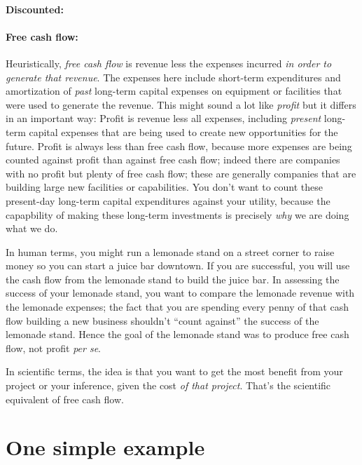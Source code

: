 \documentclass[12pt,twoside,pdftex]{article}
\begin{document}
\paragraph{Discounted:}

\paragraph{Free cash flow:}
Heuristically, \emph{free cash flow} is revenue less the expenses
incurred \emph{in order to generate that revenue}.  The expenses here
include short-term expenditures and amortization of \emph{past}
long-term capital expenses on equipment or facilities that were used
to generate the revenue.  This might sound a lot like \emph{profit}
but it differs in an important way: Profit is revenue less all
expenses, including \emph{present} long-term capital expenses that are
being used to create new opportunities for the future.  Profit is
always less than free cash flow, because more expenses are being
counted against profit than against free cash flow; indeed there are
companies with no profit but plenty of free cash flow; these are
generally companies that are building large new facilities or
capabilities.  You don't want to count these present-day long-term
capital expenditures against your utility, because the capapbility of
making these long-term investments is precisely \emph{why} we are
doing what we do.

In human terms, you might run a lemonade stand on a street corner to
raise money so you can start a juice bar downtown.  If you are
successful, you will use the cash flow from the lemonade stand to
build the juice bar.  In assessing the success of your lemonade stand,
you want to compare the lemonade revenue with the lemonade expenses;
the fact that you are spending every penny of that cash flow building
a new business shouldn't ``count against'' the success of the lemonade
stand.  Hence the goal of the lemonade stand was to produce free cash
flow, not profit \emph{per se}.

In scientific terms, the idea is that you want to get the most benefit
from your project or your inference, given the cost \emph{of that
  project}.  That's the scientific equivalent of free cash flow.

\section{One simple example}
\end{document}
